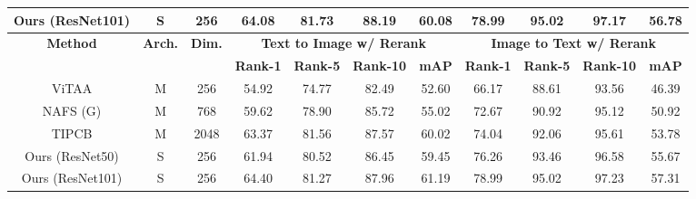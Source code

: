 \documentclass{bmvc2k}
\newcommand{\first}[1]{\textcolor{myred}{#1}}
\newcommand{\second}[1]{\textcolor{myblue}{#1}}
\begin{document}
\begin{table}[t]
\begin{center}
{\begin{tabular}{|c|c|c|c|c|c|c|c|c|c|c|}
\rowcolor[RGB]{230,230,230}
Ours (ResNet101)                            & S  & 256                                   & \first{64.08}           & \second{81.73}           & \second{88.19}            & \first{60.08}        & \first{78.99}           & \first{95.02}           & \first{97.17}            & \first{56.78}        \\ \hline \hline
\multirow{2}{*}{\textbf{Method}} & \multirow{2}{*}{\textbf{Arch.}} & \multirow{2}{*}{\textbf{Dim.}} & \multicolumn{4}{c|}{\textbf{Text to Image w/ Rerank}}              & \multicolumn{4}{c|}{\textbf{Image to Text w/ Rerank}}              \\ \cline{4-11} 
            &                     &                                       & \textbf{Rank-1} & \textbf{Rank-5} & \textbf{Rank-10} & \textbf{mAP} & \textbf{Rank-1} & \textbf{Rank-5} & \textbf{Rank-10} & \textbf{mAP} \\ \hline \hline
ViTAA \cite{wang2020vitaa}                           & M & 256                              & 54.92           & 74.77           & 82.49            & 52.60        & 66.17           & 88.61           & 93.56            & 46.39        \\ \hline
NAFS (G) \cite{gao2021contextual}                           & M  & 768                            & 59.62           & 78.90           & 85.72            & 55.02            & 72.67           & 90.92          & 95.12            & 50.92            \\ \hline
TIPCB \cite{chen2021tipcb}                           & M    & 2048                          & \second{63.37}           & \first{81.56}           & \second{87.57}            & \second{60.02}            & 74.04           & 92.06          & 95.61            & 53.78            \\ \hline
\rowcolor[RGB]{230,230,230}
Ours (ResNet50)                             & S     & 256                                & 61.94           & 80.52           & 86.45            & 59.45        & \second{76.26}           & \second{93.46}           & \second{96.58}            & \second{55.67}        \\ \hline
\rowcolor[RGB]{230,230,230}
Ours (ResNet101)                             & S   & 256                                  & \first{64.40}           & \second{81.27}           & \first{87.96}            & \first{61.19}        & \first{78.99}           & \first{95.02}           & \first{97.23}            & \first{57.31}        \\ \hline
\end{tabular}
}
\end{center}
\end{table}
\end{document}
